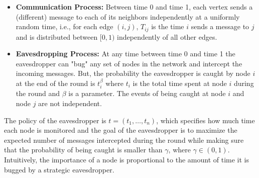 \documentclass[11pt]{article}
\begin{document}
\begin{itemize}
\item \textbf{Communication Process:} Between time 0 and time 1, each vertex sends a (different) message to each of its neighbors independently at a uniformly random time, i.e., for each edge $(i,j)$, $T_{ij}$ is the time $i$ sends a message to $j$ and is distributed between $[0, 1)$ independently of all other edges.

\item \textbf{Eavesdropping Process:} At any time between time 0 and time 1 the eavesdropper can "bug" any set of nodes in the network and intercept the incoming messages. But, the probability the eavesdropper is caught by node $i$ at the end of the round is $t_i^{\beta}$ where $t_i$ is the total time spent at node $i$ during the round and $\beta$ is a parameter. The events of being caught at node $i$ and node $j$ are not independent.
\end{itemize}

\noindent The policy of the eavesdropper is $t = (t_1, \ldots, t_n)$, which specifies how much time each node is monitored and the goal of the eavesdropper is to maximize the expected number of messages intercepted during the round while making sure that the probability of being caught is smaller than $\gamma$, where $\gamma \in (0, 1)$.\\

\noindent Intuitively, the importance of a node is proportional to the amount of time it is bugged by a strategic eavesdropper.
\end{document}
